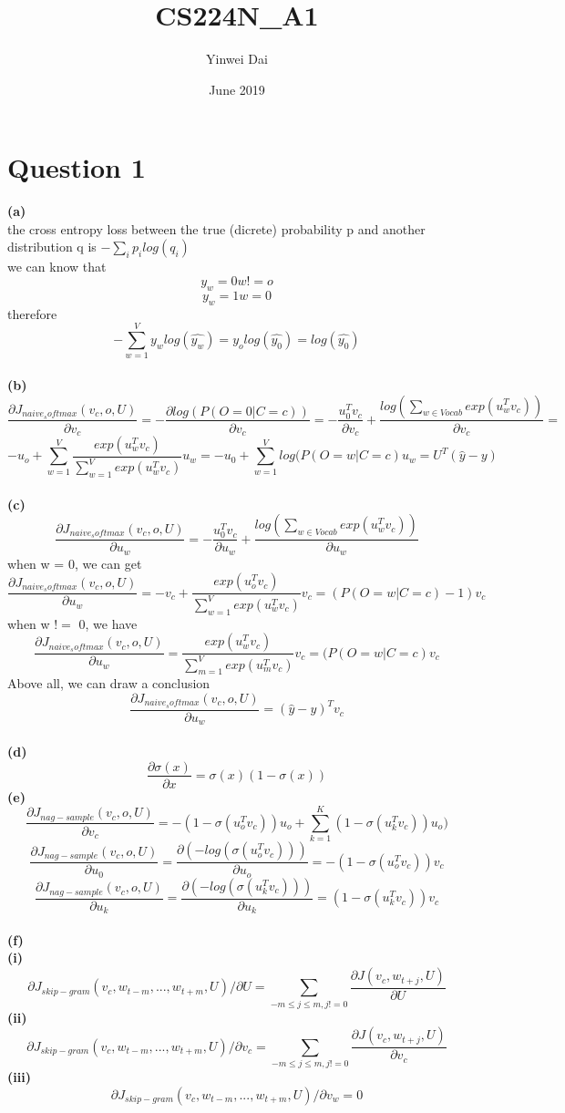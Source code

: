 \documentclass{article}
\title{CS224N_A1}
\author{Yinwei Dai}
\date{June 2019}
\begin{document}
\maketitle

\section{Question 1}

\textbf{(a)}\\
the cross entropy loss between the true (dicrete) probability p and another distribution q is $-\sum_i p_ilog(q_i)$\\
we can know that\\
$$
y_w = 0 w != o
$$
$$
y_w = 1 w = 0 
$$
therefore 
$$
-\sum_{w = 1}^{V} y_w log(\hat{y_w}) = y_o log(\hat{y_0}) = log(\hat{y_0})
$$
\\
\textbf{(b)}\\ 
$$
\frac{\partial J_{naive_softmax}(v_c, o, U)}{\partial v_c} = -\frac{\partial log(P(O = 0 | C = c))}{\partial v_c} = 
-\frac{u_0^{T}v_c}{\partial v_c} + \frac{log(\sum_{w \in Vocab} exp(u_w^T v_c))}{\partial v_c} = 
$$
$$
-u_o + \sum_{w = 1}^{V} \frac{exp(u_w^T v_c)}{ \sum_{w = 1}^{V}exp(u_w^T v_c) } u_w = -u_0 +  \sum_{w = 1}^{V}log(P(O = w | C = c) u_w = U^T(\hat{y} - y)
$$
\\
\textbf{(c)}\\
$$
\frac{\partial J_{naive_softmax}(v_c, o, U)}{\partial u_w} = -\frac{u_0^{T}v_c}{\partial u_w} + \frac{log(\sum_{w \in Vocab} exp(u_w^T v_c))}{\partial u_w}
$$
when w = 0, we can get 
$$
\frac{\partial J_{naive_softmax}(v_c, o, U)}{\partial u_w} = -v_c +  \frac{exp(u_o^T v_c)}{ \sum_{w = 1}^{V}exp(u_w^T v_c) } v_c = (P(O = w | C = c) - 1)v_c 
$$
when w $!=$ 0, we have 
$$
\frac{\partial J_{naive_softmax}(v_c, o, U)}{\partial u_w} =  \frac{exp(u_w^T v_c)}{ \sum_{m = 1}^{V}exp(u_m^T v_c) } v_c = (P(O = w | C = c) v_c
$$
Above all, we can draw a conclusion
$$
\frac{\partial J_{naive_softmax}(v_c, o, U)}{\partial u_w} = (\hat{y} - y)^T v_c
$$
\\
\textbf{(d)}\\
$$
\frac{\partial \sigma(x)}{\partial x} = \sigma(x) (1 - \sigma(x))  
$$
\textbf{(e)}\\
$$
\frac{\partial J_{nag-sample}(v_c, o, U)}{\partial v_c} = -(1 - \sigma(u_o^Tv_c))u_o + \sum_{k=1}^K (1 - \sigma(u_k^Tv_c))u_o)
$$
$$
\frac{\partial J_{nag-sample}(v_c, o, U)}{\partial u_0} = \frac{\partial(-log(\sigma(u_o^Tv_c)))}{\partial u_o} = -(1 - \sigma(u_o^Tv_c))v_c
$$
$$
\frac{\partial J_{nag-sample}(v_c, o, U)}{\partial u_k} = \frac{\partial(-log(\sigma(u_k^Tv_c)))}{\partial u_k} = (1 - \sigma(u_k^Tv_c))v_c
$$
\\
\textbf{(f)}\\
\textbf{(i)}\\
$$
\partial J_{skip-gram} (v_c, w_{t-m}, ..., w_{t+m}, U)/\partial U = \sum_{-m \leq j \leq m, j!=0} \frac{\partial J(v_c, w_{t+j}, U)}{\partial U}
$$
\textbf{(ii)}\\
$$
\partial J_{skip-gram} (v_c, w_{t-m}, ..., w_{t+m}, U)/\partial v_c =  \sum_{-m \leq j \leq m, j!=0} \frac{\partial J(v_c, w_{t+j}, U)}{\partial v_c}
$$
\textbf{(iii)}\\
$$
\partial J_{skip-gram} (v_c, w_{t-m}, ..., w_{t+m}, U)/\partial v_w = 0
$$
\end{document}
